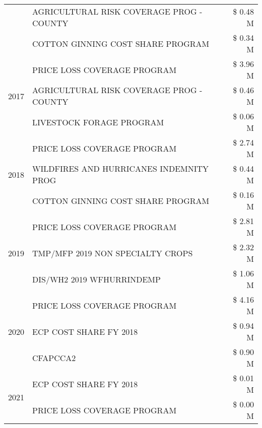 \begin{tabular}{llr}
 & AGRICULTURAL RISK COVERAGE PROG - COUNTY      & \$ 0.48 M \\
 & COTTON GINNING COST SHARE PROGRAM             & \$ 0.34 M \\
\cline{1-3}
\multirow[t]{3}{*}{2017} & PRICE LOSS COVERAGE PROGRAM & \$ 3.96 M \\
 & AGRICULTURAL RISK COVERAGE PROG - COUNTY & \$ 0.46 M \\
 & LIVESTOCK FORAGE PROGRAM & \$ 0.06 M \\
\cline{1-3}
\multirow[t]{3}{*}{2018} & PRICE LOSS COVERAGE PROGRAM & \$ 2.74 M \\
 & WILDFIRES AND HURRICANES INDEMNITY PROG & \$ 0.44 M \\
 & COTTON GINNING COST SHARE PROGRAM & \$ 0.16 M \\
\cline{1-3}
\multirow[t]{3}{*}{2019} & PRICE LOSS COVERAGE PROGRAM & \$ 2.81 M \\
 & TMP/MFP 2019 NON SPECIALTY CROPS & \$ 2.32 M \\
 & DIS/WH2 2019 WFHURRINDEMP & \$ 1.06 M \\
\cline{1-3}
\multirow[t]{3}{*}{2020} & PRICE LOSS COVERAGE PROGRAM & \$ 4.16 M \\
 & ECP COST SHARE FY 2018 & \$ 0.94 M \\
 & CFAPCCA2 & \$ 0.90 M \\
\cline{1-3}
\multirow[t]{2}{*}{2021} & ECP COST SHARE FY 2018 & \$ 0.01 M \\
 & PRICE LOSS COVERAGE PROGRAM & \$ 0.00 M \\
\cline{1-3}
\bottomrule
\end{tabular}
